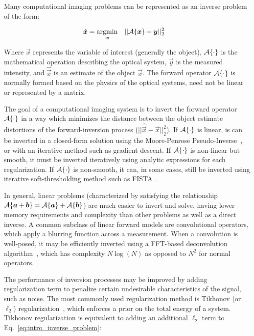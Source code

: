 Many computational imaging problems can be represented as an inverse problem of the form:

\begin{equation}\label{eq:intro_inverse_problem}
\begin{aligned}
& \hat{\bm{x}} = \underset{\bm{\bm{x}}}{\text{argmin}}
& & ||\mathcal{A}\{\bm{x}\} - \bm{y} ||_2^2
\end{aligned}
\end{equation}

Where $\vec{x}$ represents the variable of interest (generally the object), $\mathcal{A}\{\cdot\}$ is the mathematical operation describing the optical system, $\vec{y}$ is the measured intensity, and $\hat{\vec{x}}$ is an estimate of the object $\vec{x}$. The forward operator $\mathcal{A}\{\cdot\}$ is normally formed based on the physics of the optical systems, need not be linear or represented by a matrix.

The goal of a computational imaging system is to invert the forward operator $\mathcal{A}\{\cdot\}$ in a way which minimizes the distance between the object estimate distortions of the forward-inversion process ($||\hat{\vec{x}} - \vec{x}||_2^2$). If $\mathcal{A}\{\cdot\}$ is linear, is can be inverted in a closed-form solution using the Moore-Penrose Pseudo-Inverse~\cite{moore1920reciprocal}, or with an iterative method such as gradient descent. If $\mathcal{A}\{\cdot\}$ is non-linear but smooth, it must be inverted iteratively using analytic expressions for each regularization. If $\mathcal{A}\{\cdot\}$ is non-smooth, it can, in some cases, still be inverted using iterative soft-thresholding method such as FISTA~\cite{beck2009fast}. 

In general, linear problems (characterized by satisfying the relationship $\mathcal{A}\{\bm{a} + \bm{b}\} = \mathcal{A}\{\bm{a}\} + \mathcal{A}\{\bm{b}\} $) are much easier to invert and solve, having lower memory requirements and complexity than other problems as well as a direct inverse. A common subclass of linear forward models are convolutional operators, which apply a blurring function across a measurement. When a convolution is well-posed, it may be efficiently inverted using a FFT-based deconvolution algorithm~\cite{cooley1965algorithm}, which has complexity $N \log(N)$ as opposed to $N^2$ for normal operators.

The performance of inversion processes may be improved by adding regularization term to penalize certain undesirable characteristics of the signal, such as noise. The most commonly used regularization method is Tikhonov (or $\ell_2$) regularization~\cite{tikhonov1943stability}, which enforces a prior on the total energy of a system. Tikhonov regularization is equivalent to adding an additional $\ell_2$ term to Eq.~\ref{eq:intro_inverse_problem}:

